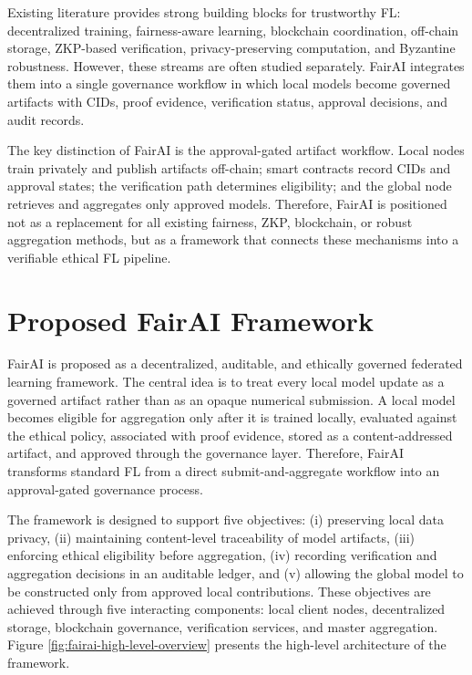 \documentclass[futureinternet,article,submit,pdftex,moreauthors]{Definitions/mdpi}
\begin{document}
Existing literature provides strong building blocks for trustworthy FL: decentralized training, fairness-aware learning, blockchain coordination, off-chain storage, ZKP-based verification, privacy-preserving computation, and Byzantine robustness. However, these streams are often studied separately. FairAI integrates them into a single governance workflow in which local models become governed artifacts with CIDs, proof evidence, verification status, approval decisions, and audit records.

The key distinction of FairAI is the approval-gated artifact workflow. Local nodes train privately and publish artifacts off-chain; smart contracts record CIDs and approval states; the verification path determines eligibility; and the global node retrieves and aggregates only approved models. Therefore, FairAI is positioned not as a replacement for all existing fairness, ZKP, blockchain, or robust aggregation methods, but as a framework that connects these mechanisms into a verifiable ethical FL pipeline.

\section{Proposed FairAI Framework}
\label{sec:proposed-framework}

FairAI is proposed as a decentralized, auditable, and ethically governed federated learning framework. The central idea is to treat every local model update as a governed artifact rather than as an opaque numerical submission. A local model becomes eligible for aggregation only after it is trained locally, evaluated against the ethical policy, associated with proof evidence, stored as a content-addressed artifact, and approved through the governance layer. Therefore, FairAI transforms standard FL from a direct submit-and-aggregate workflow into an approval-gated governance process.

The framework is designed to support five objectives: (i) preserving local data privacy, (ii) maintaining content-level traceability of model artifacts, (iii) enforcing ethical eligibility before aggregation, (iv) recording verification and aggregation decisions in an auditable ledger, and (v) allowing the global model to be constructed only from approved local contributions. These objectives are achieved through five interacting components: local client nodes, decentralized storage, blockchain governance, verification services, and master aggregation. Figure \ref{fig:fairai-high-level-overview} presents the high-level architecture of the framework.
\end{document}
